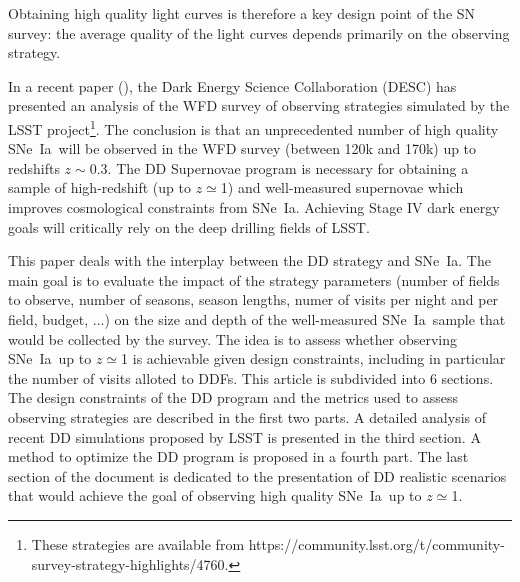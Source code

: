 \documentclass[skiphelvet,twocolumn]{aastex63}
\newcommand{\sne}{{SNe~Ia}}
\begin{document}
Obtaining high quality light curves is therefore a key design point of the SN survey:  the average quality of the light curves depends primarily on the observing strategy.
\par
In a recent paper (\cite{lochner2021impact}), the Dark Energy Science Collaboration (DESC) has presented an analysis of the WFD survey of observing strategies simulated by the LSST project\footnote{These strategies are available from https://community.lsst.org/t/community-survey-strategy-highlights/4760.}. The conclusion is that an unprecedented number of high quality \sne~will be observed in the WFD survey (between 120k and 170k) up to redshifts $z\sim 0.3$. The DD Supernovae program is necessary for obtaining a sample of high-redshift (up to $z\simeq$1) and well-measured supernovae which improves cosmological constraints from \sne. Achieving Stage IV dark energy goals will critically rely on the deep drilling fields of LSST.
\par
This paper deals with the interplay between the DD strategy and \sne. The main goal is to evaluate the impact of the strategy parameters (number of fields to observe, number of seasons, season lengths, numer of visits per night and per field, budget, ...) on the size and depth of the well-measured \sne~sample that would be collected by the survey. The idea is to assess whether observing \sne~up to $z\simeq$1 is achievable given design constraints, including in particular the number of visits alloted to DDFs. This article is subdivided into 6 sections. The design constraints of the DD program and the metrics used to assess observing strategies are described in the first two parts. A detailed analysis of recent DD simulations proposed by LSST is presented in the third section. A method to optimize the DD program is proposed in a fourth part. The last section of the document is dedicated to the presentation of  DD realistic scenarios that would achieve the goal of observing high quality \sne~up to  $z\simeq$1.
\end{document}
